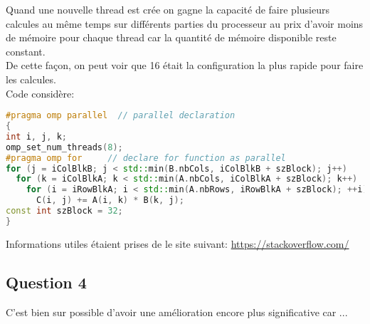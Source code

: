\documentclass{article}
\begin{document}
\begin{resolution}
Quand une nouvelle thread est crée on gagne la capacité de faire plusieurs calcules au même temps sur différents parties du processeur au prix d'avoir moins de mémoire pour chaque thread car la quantité de mémoire disponible reste constant.\\

De cette façon, on peut voir que 16 était la configuration la plus rapide pour faire les calcules.\\

Code considère:
\begin{scriptsize}
    \mycode
    \begin{lstlisting}[language=C++]
#pragma omp parallel  // parallel declaration
{
int i, j, k;
omp_set_num_threads(8);
#pragma omp for     // declare for function as parallel
for (j = iColBlkB; j < std::min(B.nbCols, iColBlkB + szBlock); j++)
  for (k = iColBlkA; k < std::min(A.nbCols, iColBlkA + szBlock); k++)
    for (i = iRowBlkA; i < std::min(A.nbRows, iRowBlkA + szBlock); ++i)
      C(i, j) += A(i, k) * B(k, j);
const int szBlock = 32;
}
    \end{lstlisting}
\end{scriptsize}

Informations utiles étaient prises de le site suivant: \href{https://stackoverflow.com/questions/22634121/openmp-c-matrix-multiplication-run-slower-in-parallel}{https://stackoverflow.com/}
\end{resolution}

\subsection*{Question 4}
\begin{resolution}
    C'est bien sur possible d'avoir une amélioration encore plus significative car ...
\end{resolution}
\end{document}
